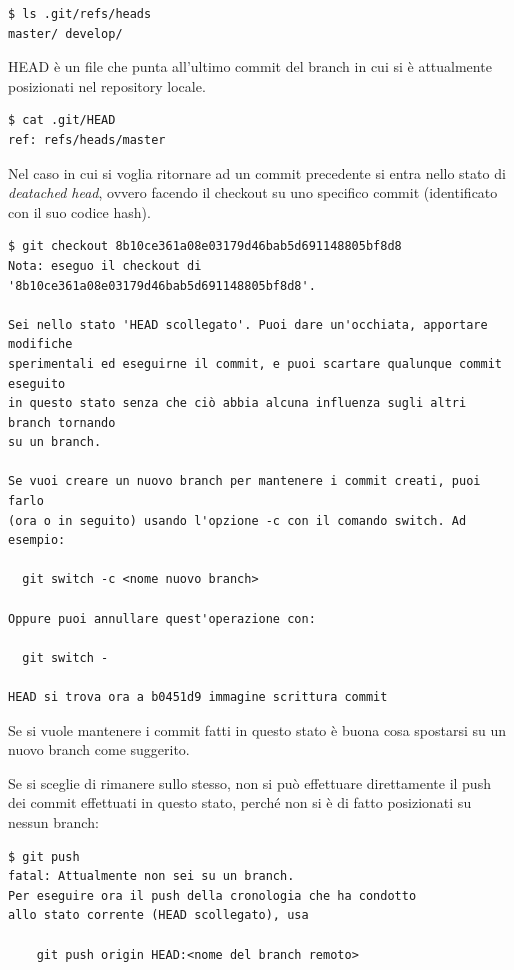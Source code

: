 \documentclass{article} \usepackage[textwidth=19cm,textheight=24cm]{geometry}
\begin{document}
\begin{verbatim}
$ ls .git/refs/heads
master/ develop/
\end{verbatim}

HEAD è un file che punta all'ultimo commit del branch in cui si è attualmente
posizionati nel repository locale.

\begin{verbatim}
$ cat .git/HEAD
ref: refs/heads/master
\end{verbatim}

Nel caso in cui si voglia ritornare ad un commit precedente si entra nello stato
di \emph{deatached head}, ovvero facendo il checkout su uno specifico commit
(identificato con il suo codice hash).

\begin{verbatim}
$ git checkout 8b10ce361a08e03179d46bab5d691148805bf8d8
Nota: eseguo il checkout di '8b10ce361a08e03179d46bab5d691148805bf8d8'.

Sei nello stato 'HEAD scollegato'. Puoi dare un'occhiata, apportare modifiche
sperimentali ed eseguirne il commit, e puoi scartare qualunque commit eseguito
in questo stato senza che ciò abbia alcuna influenza sugli altri branch tornando
su un branch.

Se vuoi creare un nuovo branch per mantenere i commit creati, puoi farlo
(ora o in seguito) usando l'opzione -c con il comando switch. Ad esempio:

  git switch -c <nome nuovo branch>

Oppure puoi annullare quest'operazione con:

  git switch -

HEAD si trova ora a b0451d9 immagine scrittura commit
\end{verbatim}

Se si vuole mantenere i commit fatti in questo stato è buona cosa spostarsi su
un nuovo branch come suggerito.

Se si sceglie di rimanere sullo stesso, non si può effettuare direttamente il push dei
commit effettuati in questo stato, perché non si è di fatto posizionati su nessun branch:

\begin{verbatim}
$ git push
fatal: Attualmente non sei su un branch.
Per eseguire ora il push della cronologia che ha condotto
allo stato corrente (HEAD scollegato), usa

    git push origin HEAD:<nome del branch remoto>
\end{verbatim}
\end{document}
